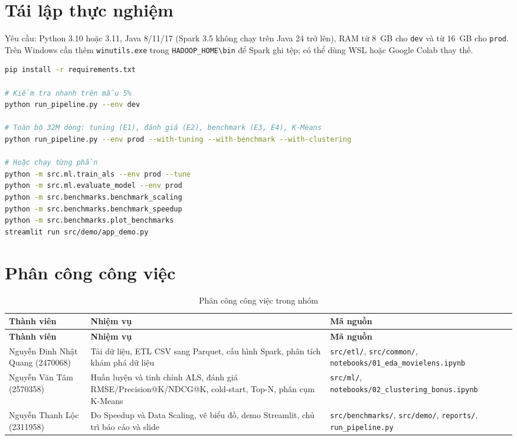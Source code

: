 \appendix
\fancyfoot{}

\chapter{Tái lập thực nghiệm}
\label{app:tai_lap}
\thispagestyle{fancy}
Yêu cầu: Python 3.10 hoặc 3.11, Java 8/11/17 (Spark 3.5 không chạy trên Java 24 trở lên), RAM từ \SI{8}{GB} cho \texttt{dev} và từ \SI{16}{GB} cho \texttt{prod}. Trên Windows cần thêm \texttt{winutils.exe} trong \texttt{HADOOP\_HOME\textbackslash bin} để Spark ghi tệp; có thể dùng WSL hoặc Google Colab thay thế. 

\begin{lstlisting}[language=bash, caption={Các lệnh tái lập E1--E4}, label={lst:tai_lap}]
pip install -r requirements.txt

# Kiểm tra nhanh trên mẫu 5%
python run_pipeline.py --env dev

# Toàn bộ 32M dòng: tuning (E1), đánh giá (E2), benchmark (E3, E4), K-Means
python run_pipeline.py --env prod --with-tuning --with-benchmark --with-clustering

# Hoặc chạy từng phần
python -m src.ml.train_als --env prod --tune
python -m src.ml.evaluate_model --env prod
python -m src.benchmarks.benchmark_scaling
python -m src.benchmarks.benchmark_speedup
python -m src.benchmarks.plot_benchmarks
streamlit run src/demo/app_demo.py
\end{lstlisting}

\chapter{Phân công công việc}
\label{app:phan_cong}
\thispagestyle{fancy}

\begin{longtable}{p{}p{}>{\footnotesize\raggedright\arraybackslash}p{}}
\caption{Phân công công việc trong nhóm}\label{tab:phan_cong}\\
\toprule
\textbf{Thành viên} & \textbf{Nhiệm vụ} & \textbf{Mã nguồn} \\
\midrule
\endfirsthead
\toprule
\textbf{Thành viên} & \textbf{Nhiệm vụ} & \textbf{Mã nguồn} \\
\midrule
\endhead
\bottomrule
\endfoot
Nguyễn Đinh Nhật Quang (2470068) & Tải dữ liệu, ETL CSV sang Parquet, cấu hình Spark, phân tích khám phá dữ liệu & \texttt{src/etl/}, \texttt{src/common/}, \texttt{notebooks/}\allowbreak\texttt{01\_eda\_movielens.ipynb} \\
Nguyễn Văn Tâm (2570358) & Huấn luyện và tinh chỉnh ALS, đánh giá RMSE/Precision@K/NDCG@K, cold-start, Top-N, phân cụm K-Means & \texttt{src/ml/}, \texttt{notebooks/}\allowbreak\texttt{02\_clustering\_bonus.ipynb} \\
Nguyễn Thanh Lộc (2311958) & Đo Speedup và Data Scaling, vẽ biểu đồ, demo Streamlit, chủ trì báo cáo và slide & \texttt{src/benchmarks/}, \texttt{src/demo/}, \texttt{reports/}, \texttt{run\_pipeline.py} \\
\end{longtable}
